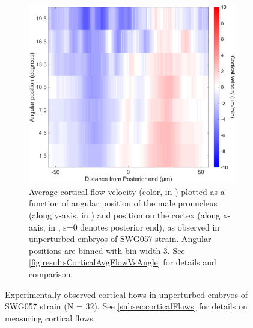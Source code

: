 \begin{figure}
\hfill
\begin{subfigure}[t]{0.45\textwidth}
    \centering
    \includegraphics[width=\textwidth]{Results/FigExpGoa1Gpa16/wt_corticalflow_angleFig.pdf}
    \caption{Average cortical flow velocity (color, in \si{\unitCrtxVel}) plotted as a function of angular position of the male pronucleus (along y-axis, in \si{\unitAngle}) and position on the cortex (along x-axis, in \si{\unitLength}, s=\SI{0}{\unitLength} denotes posterior end), as observed in unperturbed embryos of SWG057 strain. Angular positions are binned with bin width \SI{3}{\unitAngle}. See \autoref{fig:resultsCorticalAvgFlowVsAngle} for details and comparison.} 
    \label{subfig:swg057WtCrtxFlow-VsAngle}
\end{subfigure}
\caption[Experimentally observed cortical flows in unperturbed SWG057 embryos]{Experimentally observed cortical flows in unperturbed embryos of SWG057 strain (N = 32). See \autoref{subsec:corticalFlows} for details on measuring cortical flows.}
\label{fig:swg057WtCrtxFlow}
\end{figure}

